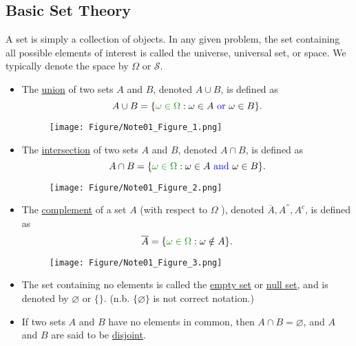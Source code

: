 \documentclass[12pt,thmsa]{article}
\let\emptyset\varnothing
\begin{document}
\subsection{Basic Set Theory} %
A set is simply a collection of objects. In any given problem, the set containing all possible elements of interest is called the universe, universal set, or space. We typically denote the space by \(\Omega\) or \(\mathcal{S}\).
\begin{itemize}
	\item The \underline{union} of two sets \(A\) and \(B\), denoted \(A \cup B\), is defined as \[
A \cup B =\{ {\color{forestgreen}{\omega \in \Omega}}: \omega \in A {\color{blue}{\text { or }}} \omega \in B\}.
\]
    \begin{figure}[H] %
    \centering
    \texttt{[image: Figure/Note01\_Figure\_1.png]}
    \end{figure}
    
	\item  The \underline{intersection} of two sets \(A\) and \(B\), denoted \(A \cap B\), is defined as \[
A \cap B=\{ {\color{forestgreen}{\omega \in \Omega}}: \omega \in A {\color{blue}{\text { and }}} \omega \in B\}.
\]
    \begin{figure}[H] %
    \centering
    \texttt{[image: Figure/Note01\_Figure\_2.png]}
    \end{figure}

	\item The \underline{complement} of a set \(A\) (with respect to \(\Omega\) ), denoted \(\overline{A}, A^{''}, A^{c}\), is defined as \[
\overline{A}=\{ {\color{forestgreen}{\omega \in \Omega}}: \omega \notin  A\}.
\]
    \begin{figure}[H] %
    \centering
    \texttt{[image: Figure/Note01\_Figure\_3.png]}
    \end{figure}

	\item The set containing no elements is called the \underline{empty set} or \underline{null set}, and is denoted by \(\emptyset\) or \(\{ \}\). (n.b. \(\{\emptyset\}\) is not correct notation.)

	\item  If two sets \(A\) and \(B\) have no elements in common, then \(A \cap B = \emptyset\), and \(A\) and \(B\) are said to be \underline{disjoint}.


\end{itemize}
\end{document}
